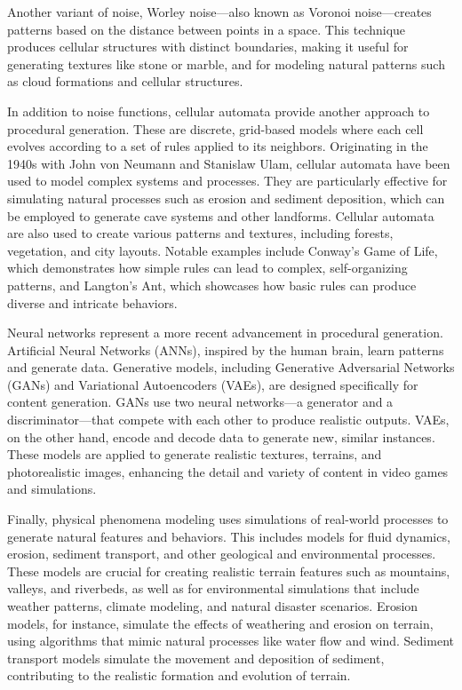 Another variant of noise, Worley noise—also known as Voronoi noise—creates patterns based on the distance between points in a space. This technique produces cellular structures with distinct boundaries, making it useful for generating textures like stone or marble, and for modeling natural patterns such as cloud formations and cellular structures.

In addition to noise functions, cellular automata provide another approach to procedural generation. These are discrete, grid-based models where each cell evolves according to a set of rules applied to its neighbors. Originating in the 1940s with John von Neumann and Stanislaw Ulam, cellular automata have been used to model complex systems and processes. They are particularly effective for simulating natural processes such as erosion and sediment deposition, which can be employed to generate cave systems and other landforms. Cellular automata are also used to create various patterns and textures, including forests, vegetation, and city layouts. Notable examples include Conway's Game of Life, which demonstrates how simple rules can lead to complex, self-organizing patterns, and Langton's Ant, which showcases how basic rules can produce diverse and intricate behaviors.

Neural networks represent a more recent advancement in procedural generation. Artificial Neural Networks (ANNs), inspired by the human brain, learn patterns and generate data. Generative models, including Generative Adversarial Networks (GANs) and Variational Autoencoders (VAEs), are designed specifically for content generation. GANs use two neural networks—a generator and a discriminator—that compete with each other to produce realistic outputs. VAEs, on the other hand, encode and decode data to generate new, similar instances. These models are applied to generate realistic textures, terrains, and photorealistic images, enhancing the detail and variety of content in video games and simulations.

Finally, physical phenomena modeling uses simulations of real-world processes to generate natural features and behaviors. This includes models for fluid dynamics, erosion, sediment transport, and other geological and environmental processes. These models are crucial for creating realistic terrain features such as mountains, valleys, and riverbeds, as well as for environmental simulations that include weather patterns, climate modeling, and natural disaster scenarios. Erosion models, for instance, simulate the effects of weathering and erosion on terrain, using algorithms that mimic natural processes like water flow and wind. Sediment transport models simulate the movement and deposition of sediment, contributing to the realistic formation and evolution of terrain.

